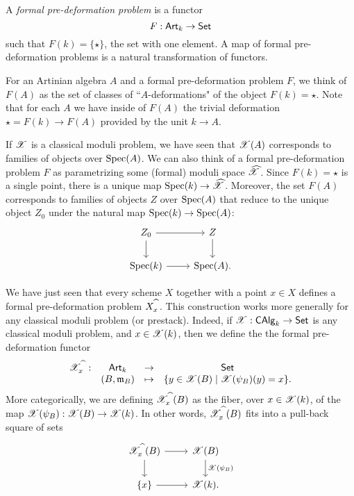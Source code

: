 \documentclass[11pt]{amsart}
\begin{document}
\begin{dfn}
A {\em formal pre-deformation problem} is a functor
\[
F : \Art_k \to \Set
\]
such that $F(k) = \{\star\}$, the set with one element. 
A map of formal pre-deformation problems is a natural transformation of functors. 
\end{dfn}

For an Artinian algebra $A$ and a formal pre-deformation problem $F$, we think of $F(A)$ as the set of classes of ``$A$-deformations" of the object $F(k) = \star$. 
Note that for each $A$ we have inside of $F(A)$ the trivial deformation $\star = F(k) \to F(A)$ provided by the unit $k \to A$. 

\begin{rmk}
If $\sX$ is a classical moduli problem, we have seen that $\sX(A)$ corresponds to families of objects over ${\rm Spec}(A)$. 
We can also think of a formal pre-deformation problem $F$ as parametrizing some (formal) moduli space $\Hat{\sX}$.
Since $F(k) = \star$ is a single point, there is a unique map ${\rm Spec}(k) \to \Hat{\sX}$. 
Moreover, the set $F(A)$ corresponds to families of objects $Z$ over ${\rm Spec}(A)$ that reduce to the unique object $Z_0$ under the natural map ${\rm Spec}(k) \to {\rm Spec}(A)$:
\[
\begin{tikzcd}
Z_0 \ar[r] \ar[d] & Z \ar[d] \\
{\rm Spec}(k) \ar[r] & {\rm Spec}(A) .
\end{tikzcd}
\]
\end{rmk}

\begin{eg}
We have just seen that every scheme $X$ together with a point $x \in X$ defines a formal pre-deformation problem $X^{\Hat{\;\;}}_x$. 
This construction works more generally for any classical moduli problem (or prestack). 
Indeed, if $\sX : \CAlg_k \to \Set$ is any classical moduli problem, and $x \in \sX(k)$, then we define the the formal pre-deformation functor
\[
\begin{array}{cccc}
\sX^{\Hat{\;\;}}_x : & \Art_k & \to & \Set \\
& (B,\fm_B) & \mapsto & \{y \in \sX(B) \; | \; \sX(\psi_B)(y) = x\} . 
\end{array}
\]
More categorically, we are defining $\sX^{\Hat{\;\;}}_x(B)$ as the fiber, over $x \in \sX(k)$, of the map $\sX(\psi_B) : \sX(B) \to \sX(k)$. 
In other words, $\sX^{\Hat{\;\;}}_x(B)$ fits into a pull-back square of sets
\[
\begin{tikzcd}
\sX^{\Hat{\;\;}}_x(B) \ar[d] \ar[r] & \sX(B) \ar[d, "\sX(\psi_B)"] \\
\{x\} \ar[r] & \sX(k) .
\end{tikzcd}
\]
\end{eg}
\end{document}
